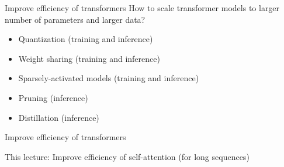 \documentclass[usenames,dvipsnames,notes,11pt,aspectratio=169,hyperref={colorlinks=true, linkcolor=blue}]{beamer}
\begin{document}
\begin{frame}
    {Improve efficiency of transformers}
    How to scale transformer models to larger number of parameters and larger data?

    \begin{itemize}
        \item Quantization (training and inference)
        \item Weight sharing (training and inference)
        \item Sparsely-activated models (training and inference)
        \item Pruning (inference)
        \item Distillation (inference)
    \end{itemize}
\end{frame}

\begin{frame}
    {Improve efficiency of transformers}

    This lecture: {Improve efficiency of self-attention (for long sequences)}


\end{frame}
\end{document}
